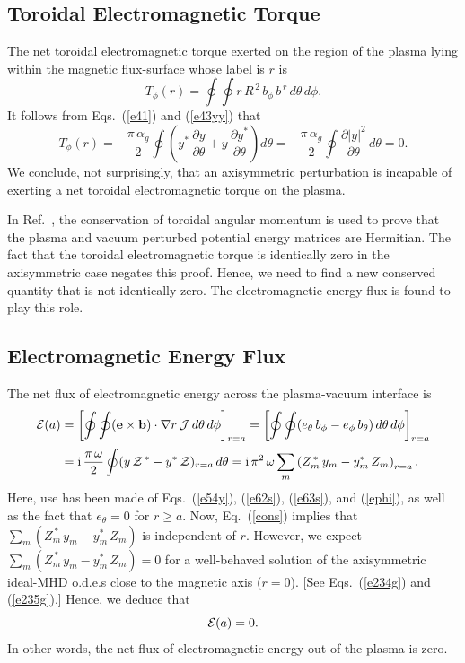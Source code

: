 \documentclass[12pt,prb,aps]{revtex4-1}
\begin{document}
\subsection{Toroidal Electromagnetic Torque}\label{storque}
The net toroidal electromagnetic torque exerted on the region of the plasma lying within the magnetic flux-surface whose label is $r$ is\,\cite{tj}
\begin{equation}
T_\phi(r)= \oint\oint r\,R^{\,2}\,b_\phi\,b^{\,r}\,d\theta\,d\phi.
\end{equation}
It follows from Eqs.~(\ref{e41}) and (\ref{e43yy}) that 
\begin{equation}
T_\phi(r) = -\frac{\pi\,\alpha_g}{2}\oint\left(y^\ast\,\frac{\partial y}{\partial\theta}+y\,\frac{\partial y^\ast}{\partial\theta}\right)d\theta
= -\frac{\pi\,\alpha_g}{2}\oint\frac{\partial|y|^2}{\partial\theta}\,d\theta = 0.
\end{equation}
We conclude, not surprisingly,  that an axisymmetric perturbation is incapable of exerting a net toroidal electromagnetic torque on the plasma. 

In Ref.~, the conservation of toroidal angular momentum is used to prove that the plasma and vacuum perturbed potential energy matrices are Hermitian.
The fact that the toroidal electromagnetic torque is identically  zero in the axisymmetric case negates this proof. Hence, we need to find a new conserved quantity
that is not identically zero. The electromagnetic energy flux is found to play this role. 

\subsection{Electromagnetic Energy Flux}
The net flux of electromagnetic energy across the plasma-vacuum interface is 
\begin{align}\label{eflux}
{\cal E}(a) &= \left[\oint\oint ({\bf e}\times {\bf b})\cdot\nabla r\,{\cal J}\,d\theta\,d\phi\right]_{r=a}= \left[\oint\oint (e_\theta\,b_\phi-e_\phi\,b_\theta)\,d\theta\,d\phi\right]_{r=a}\nonumber\\[0.5ex]
&={\rm i}\,\frac{\pi\,\omega}{2}\oint (y\,{\cal Z}^{\,\ast}-y^\ast \,{\cal Z})_{r=a}\,d\theta={\rm i}\,\pi^2\,\omega \sum_{m}\left(Z_m^{\,\ast}\,y_m-y_m^\ast\,Z_m\right)_{r=a}.
\end{align}
Here, use has been made of Eqs.~(\ref{e54y}), (\ref{e62s}), (\ref{e63s}),  and  (\ref{ephi}), as well as  the fact that $e_\theta=0$ for $r\geq a$. 
 Now, Eq.~(\ref{cons}) implies that
$\sum_m(Z_m^{\,\ast}\,y_m-y_m^\ast\,Z_m)$ is independent of $r$. However, we expect $\sum_m(Z_m^{\,\ast}\,y_m-y_m^\ast\,Z_m)=0$ for a well-behaved
solution of the axisymmetric ideal-MHD o.d.e.s close to the magnetic axis ($r=0$). [See Eqs.~(\ref{e234g}) and (\ref{e235g}).] Hence, we deduce that
\begin{equation}\label{excons}
{\cal E}(a) = 0.
\end{equation}
In other words, the net flux of electromagnetic energy out of the plasma is zero. 
\end{document}

